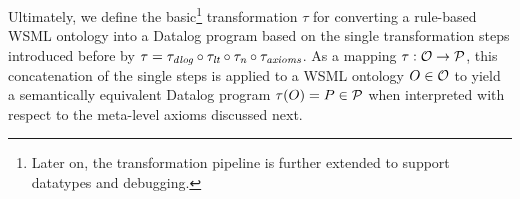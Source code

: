 \medskip

Ultimately, we define the basic\footnote{Later on, the
transformation pipeline is further extended to support datatypes
and debugging.} transformation $\tau$ for converting a rule-based
WSML ontology into a Datalog program based on the single
transformation steps introduced before by $ \tau = \transdlog
\circ \translt \circ \transnorm \circ \transax$.
As a mapping $\tau: \O \rightarrow \P$, this concatenation of the
single steps is applied to a WSML ontology $O \in \O$ to yield a
semantically equivalent Datalog program $\tau (O) = P \in \P$ when
interpreted with respect to the meta-level axioms discussed next.
